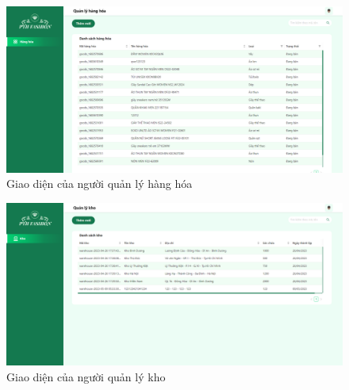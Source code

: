 \begin{figure}[!htp]
    \centering
    \includegraphics[width=12cm]{img/UI/admin_implement/goodsManager.png}
    \newline
    \caption{Giao diện của người quản lý hàng hóa}
\end{figure}

\begin{figure}[!htp]
    \centering
    \includegraphics[width=12cm]{img/UI/admin_implement/warehouseManager.png}
    \newline
    \caption{Giao diện của người quản lý kho }
\end{figure}


